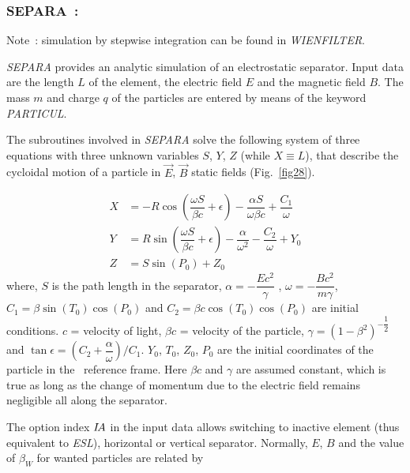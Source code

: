 {\newpage

\subsubsection*{SEPARA~: \SEPARATitl}\label{SEPARA} 
\medskip 

\noindent Note~: simulation by stepwise integration can be found in \textsl{WIENFILTER}.

\medskip

\textsl{SEPARA}  provides an analytic simulation of an electrostatic separator. 
Input data are the length $ L $ of the element, the electric field $ E $ and
the magnetic field $ B $. The mass $ m $ and charge $ q $ of the particles are
entered by means of the keyword \textsl{PARTICUL}.  
\medskip

\noindent The subroutines involved in \textsl{SEPARA} solve the following
system of three equations with three unknown variables $ S$, $Y$, $Z $ (while  $ X\equiv L $), that 
describe the cycloidal motion of a particle in $ \vec  E$,  $ \vec  B $ static
fields (Fig.~\ref{fig28}).   

\begin{align*}
	X &   =   -R  \cos \left( \dfrac{\omega S }{ \beta c} + \epsilon \right) 
	         -  \dfrac{\alpha S }{ \omega\beta c} + \dfrac{C_1 }{ \omega} \\
	Y &   =     R \sin  \left(\dfrac{\omega S }{ \beta c} + \epsilon \right) - 
	         \dfrac{\alpha }{ \omega^ 2} - \dfrac{C_2 }{ \omega}  + Y_0  \\
	Z &   =  S \sin (P_0)+Z_0   
\end{align*}
%
 where, $ S $ is the path length in the separator, $\alpha =-\dfrac{Ec^2 }{ \gamma}$ ,
   $   \omega =-\dfrac{Bc^2 }{m\gamma}$, $   C_1=\beta \sin (T_0) \cos (P_0) $ 
and $ C_2=\beta c  \cos (T_0) \cos (P_0) $ are initial conditions. 
$c$ = velocity of light, $ \beta c$ = velocity of the particle,  
$ \gamma =(1-\beta^ 2)^{-\dfrac{1 }{ 2}} $ 
and  $\tan \epsilon  =   (C_2+ \dfrac{\alpha}{\omega})/C_1 $.   $ Y_0$,   $ T_0$,  
$Z_0$,  $ P_0 $ are the initial 
coordinates of the particle in the \zgou\ reference  frame.  Here 
$\beta c $ and $\gamma$ are assumed constant, which is true as long as the change of momentum
due to the electric field remains negligible all along the separator.  
\medskip

\noindent The option index $I\!A$ in the input data allows switching to inactive
element (thus equivalent to \textsl{ESL}), horizontal or vertical separator.  
Normally, $ E$,  $B $ and the value of $ \beta_W $ for wanted particles are related by 

}
